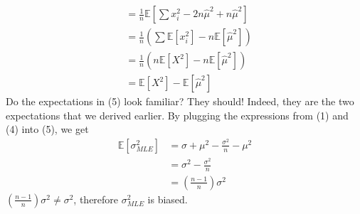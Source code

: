 \documentclass[11pt,largemargins]{homework}
\begin{document}
\begin{alphaparts}
\begin{align}
		&= \frac{1}{n}\mathbb{E}\left[ \sum x_i^2 -2n\hat{\mu}^2+n\hat{\mu}^2\right]\nonumber\\
		&= \frac{1}{n}\left( \sum{\mathbb{E}\left[x_i^2\right]}-n\mathbb{E}\left[\hat{\mu}^2\right]\right)\nonumber\\
		&= \frac{1}{n}\left( n{\mathbb{E}\left[X^2\right]}-n\mathbb{E}\left[\hat{\mu}^2\right]\right)\nonumber\\
		&= \mathbb{E}\left[X^2\right]-\mathbb{E}\left[\hat{\mu}^2\right]
	\end{align}
	Do the expectations in (5) look familiar? They should! Indeed, they are the two expectations that we derived earlier. By plugging the expressions from (1) and (4) into (5), we get
	\begin{align*}
		\mathbb{E}\left[ \sigma_{MLE}^2\right] &= \sigma + \mu^2 - \frac{\sigma^2}{n}-\mu^2\\
		&= \sigma^2 - \frac{\sigma^2}{n}\\
		&= \left(\frac{n-1}{n}\right)\sigma^2
	\end{align*}
	$\left(\frac{n-1}{n}\right)\sigma^2 \neq \sigma^2$, therefore $\sigma_{MLE}^2$ is biased.
\end{alphaparts}
\question
\end{document}
